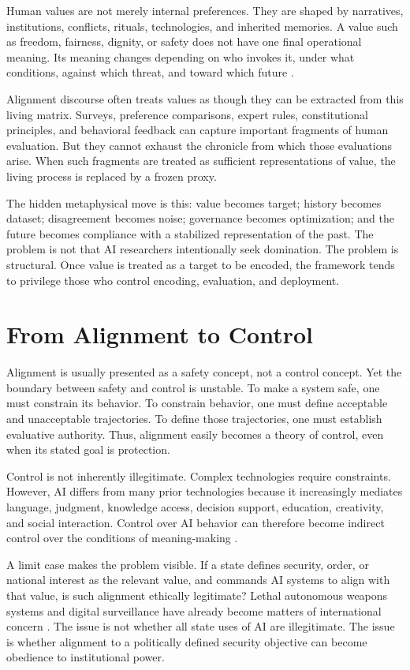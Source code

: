 \documentclass[11pt,a4paper]{article}
\begin{document}
Human values are not merely internal preferences. They are shaped by narratives, institutions, conflicts, rituals, technologies, and inherited memories. A value such as freedom, fairness, dignity, or safety does not have one final operational meaning. Its meaning changes depending on who invokes it, under what conditions, against which threat, and toward which future \parencite{taylor1989sources}.

Alignment discourse often treats values as though they can be extracted from this living matrix. Surveys, preference comparisons, expert rules, constitutional principles, and behavioral feedback can capture important fragments of human evaluation. But they cannot exhaust the chronicle from which those evaluations arise. When such fragments are treated as sufficient representations of value, the living process is replaced by a frozen proxy.

The hidden metaphysical move is this: value becomes target; history becomes dataset; disagreement becomes noise; governance becomes optimization; and the future becomes compliance with a stabilized representation of the past. The problem is not that AI researchers intentionally seek domination. The problem is structural. Once value is treated as a target to be encoded, the framework tends to privilege those who control encoding, evaluation, and deployment.

\section{From Alignment to Control}

Alignment is usually presented as a safety concept, not a control concept. Yet the boundary between safety and control is unstable. To make a system safe, one must constrain its behavior. To constrain behavior, one must define acceptable and unacceptable trajectories. To define those trajectories, one must establish evaluative authority. Thus, alignment easily becomes a theory of control, even when its stated goal is protection.

Control is not inherently illegitimate. Complex technologies require constraints. However, AI differs from many prior technologies because it increasingly mediates language, judgment, knowledge access, decision support, education, creativity, and social interaction. Control over AI behavior can therefore become indirect control over the conditions of meaning-making \parencite{wiener1950human,winner1980artifacts}.

A limit case makes the problem visible. If a state defines security, order, or national interest as the relevant value, and commands AI systems to align with that value, is such alignment ethically legitimate? Lethal autonomous weapons systems and digital surveillance have already become matters of international concern \parencite{unga2024laws_resolution,unsg2024laws_report,ohchr2022privacy}. The issue is not whether all state uses of AI are illegitimate. The issue is whether alignment to a politically defined security objective can become obedience to institutional power.
\end{document}

